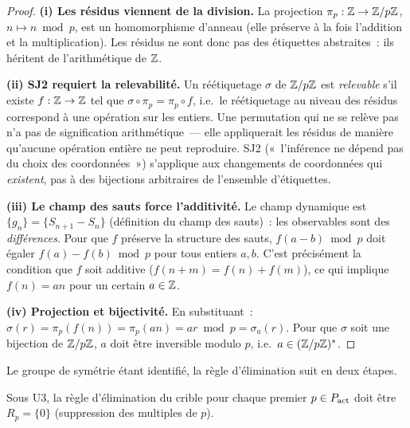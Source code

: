 \documentclass[12pt,a4paper]{article}
\begin{document}
\begin{proof}
\textbf{(i) Les résidus viennent de la division.}
La projection $\pi_p : \mathbb{Z} \to \mathbb{Z}/p\mathbb{Z}$, $n \mapsto n \bmod p$, est
un homomorphisme d'anneau (elle préserve à la fois l'addition et la
multiplication). Les résidus ne sont donc pas des étiquettes
abstraites~: ils héritent de l'arithmétique de $\mathbb{Z}$.

\textbf{(ii) SJ2 requiert la relevabilité.}
Un réétiquetage $\sigma$ de $\mathbb{Z}/p\mathbb{Z}$ est \emph{relevable} s'il
existe $f : \mathbb{Z} \to \mathbb{Z}$ tel que $\sigma \circ \pi_p = \pi_p \circ f$,
i.e.\ le réétiquetage au niveau des résidus correspond à une
opération sur les entiers. Une permutation qui ne se relève pas n'a
pas de signification arithmétique~--- elle appliquerait les résidus
de manière qu'aucune opération entière ne peut reproduire. SJ2
(«~l'inférence ne dépend pas du choix des coordonnées~») s'applique
aux changements de coordonnées qui \emph{existent}, pas à des
bijections arbitraires de l'ensemble d'étiquettes.

\textbf{(iii) Le champ des sauts force l'additivité.}
Le champ dynamique est $\{g_n\} = \{S_{n+1} - S_n\}$ (définition
du champ des sauts)~: les observables sont des \emph{différences}.
Pour que $f$ préserve la structure des sauts,
$f(a - b) \bmod p$ doit égaler $f(a) - f(b) \bmod p$ pour tous
entiers $a, b$. C'est précisément la condition que $f$ soit
additive ($f(n + m) = f(n) + f(m)$), ce qui implique $f(n) = an$
pour un certain $a \in \mathbb{Z}$.

\textbf{(iv) Projection et bijectivité.}
En substituant~: $\sigma(r) = \pi_p(f(n)) = \pi_p(an) = ar \bmod p
= \sigma_a(r)$. Pour que $\sigma$ soit une bijection de $\mathbb{Z}/p\mathbb{Z}$,
$a$ doit être inversible modulo $p$, i.e.\ $a \in (\mathbb{Z}/p\mathbb{Z})^*$.
\end{proof}

Le groupe de symétrie étant identifié, la règle d'élimination suit
en deux étapes.

\begin{lemme}[SJ2 force $R_p = \{0\}$]
\label{lem:sj2_Rp}
Sous U3, la règle d'élimination du crible pour chaque premier
$p \in P_{\rm act}$ doit être $R_p = \{0\}$ (suppression des
multiples de $p$).
\end{lemme}
\end{document}
